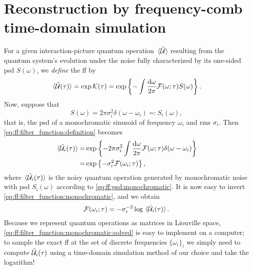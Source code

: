 \chapter{Reconstruction by frequency-comb time-domain simulation}\label{ch:ff:validation}
For a given interaction-picture quantum operation $\ev*{\liouvUe}$ resulting from the quantum system's evolution under the noise fully characterized by its one-sided \gls{psd} $S(\omega)$, we \emph{define} the \gls{ff} \FFot by
\begin{align}\label{eq:ff:filter_function:definition}
    \ev*{\liouvUe(\tau)} = \exp\cumulantfun(\tau) = \exp\left\{-\int\frac{\dd{\omega}}{2\pi}\FFot S(\omega)\right\}.
\end{align}
Now, suppose that
\begin{equation}\label{eq:ff:psd:monochromatic}
    S(\omega) = 2\pi\sigma_i^2 \delta(\omega - \omega_i) \eqqcolon S_i(\omega),
\end{equation}
that is, the \gls{psd} of a monochromatic sinusoid of frequency $\omega_i$ and \gls{rms} $\sigma_i$.
Then \cref{eq:ff:filter_function:definition} becomes
\begin{equation}\label{eq:ff:filter_function:monochromatic}
    \begin{split}
        \ev*{\liouvUe_i(\tau)} =& \exp\left\lbrace -2\pi\sigma_i^2\int\frac{\dd{\omega}}{2\pi}\FFot\delta(\omega - \omega_i)\right\rbrace \\
                               =& \exp\left\lbrace -\sigma_i^2\mc{F}(\omega_i;\tau)\right\rbrace,
    \end{split}
\end{equation}
where $\ev*{\liouvUe_i(\tau)}$ is the noisy quantum operation generated by monochromatic noise with \gls{psd} $S_i(\omega)$ according to \cref{eq:ff:psd:monochromatic}.
It is now easy to invert \cref{eq:ff:filter_function:monochromatic}, and we obtain
\begin{align}\label{eq:ff:filter_function:monochromatic:solved}
    \mc{F}(\omega_i; \tau) = -\sigma_i^{-2}\log\ev*{\liouvUe_i(\tau)}.
\end{align}
Because we represent quantum operations as matrices in Liouville space, \cref{eq:ff:filter_function:monochromatic:solved} is easy to implement on a computer; to sample the exact \gls{ff} at the set of discrete frequencies $\lbrace\omega_i\rbrace_i$ we simply need to compute $\mathcal{\tilde{U}}_i(\tau)$  using a time-domain simulation method of our choice and take the logarithm!

